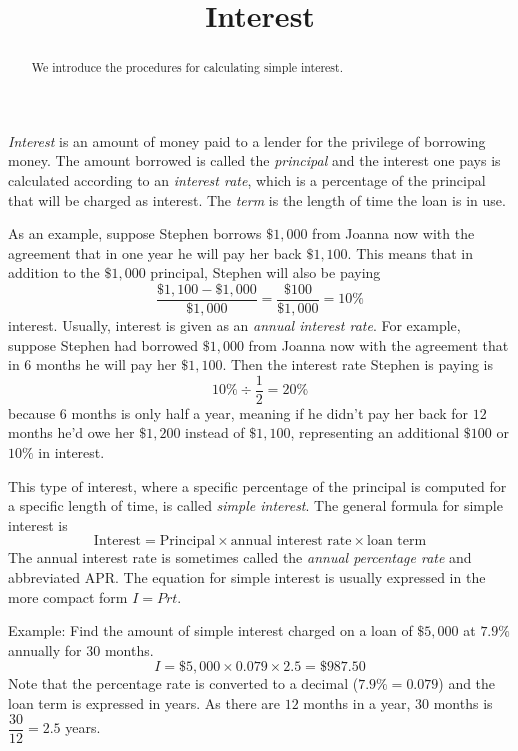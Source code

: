 \documentclass{ximera}
\title{Interest}
\begin{document}
\begin{abstract}
We introduce the procedures for calculating simple interest.
\end{abstract}
\maketitle


\emph{Interest} is an amount of money paid to a lender for the privilege of borrowing money. The amount borrowed is called the \emph{principal} and the interest one pays is calculated according to an \emph{interest rate}, which is a percentage of the principal that will be charged as interest. The \emph{term} is the length of time the loan is in use.

As an example, suppose Stephen borrows $\$1,000$ from Joanna now with the agreement that in one year he will pay her back $\$1,100$. This means that in addition to the $\$1,000$ principal, Stephen will also be paying
$$
\frac{\$1,100-\$1,000}{\$1,000}=\frac{\$100}{\$1,000}=10\%
$$
interest. Usually, interest is given as an \emph{annual interest rate}. For example, suppose Stephen had borrowed $\$1,000$ from Joanna now with the agreement that in $6$ months he will pay her $\$1,100$. Then the interest rate Stephen is paying is
$$
10\%\div \frac{1}{2}=20\%
$$
because $6$ months is only half a year, meaning if he didn't pay her back for $12$ months he'd owe her $\$1,200$ instead of $\$1,100$, representing an additional $\$100$ or $10\%$ in interest.

This type of interest, where a specific percentage of the principal is computed for a specific length of time, is called \emph{simple interest}. The general formula for simple interest is
\begin{equation}\label{simpleinterest}
\text{Interest}=\text{Principal}\times\text{annual interest rate}\times\text{loan term}
\end{equation}
The annual interest rate is sometimes called the \emph{annual percentage rate} and abbreviated APR. The equation for simple interest is usually expressed in the more compact form $I=Prt$.

Example: Find the amount of simple interest charged on a loan of $\$5,000$ at $7.9\%$ annually for $30$ months.
$$
I=\$5,000\times 0.079\times 2.5=\$987.50
$$
Note that the percentage rate is converted to a decimal ($7.9\%=0.079$) and the loan term is expressed in years. As there are $12$ months in a year, $30$ months is $\dfrac{30}{12}=2.5$ years.
\end{document}
